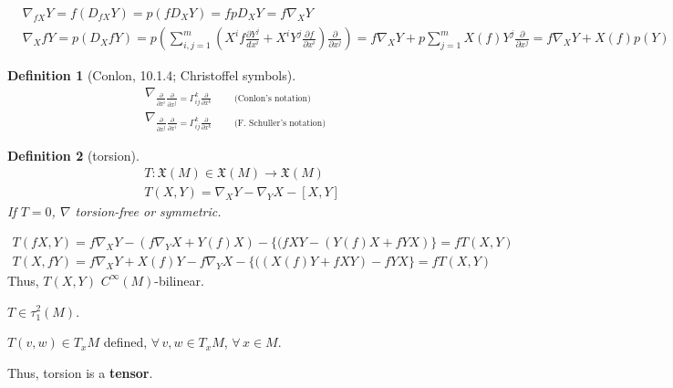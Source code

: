 \documentclass[10pt]{amsart}
\newtheorem{definition}{Definition}
\begin{document}
\begin{multicols*}{2}
\[
\begin{aligned}
	& \nabla_{fX}Y = f(D_{fX}Y) = p(fD_XY) = fpD_XY = f\nabla_XY \\ 
	&  \nabla_X fY = p(D_XfY) = p \left( \sum_{i,j=1}^m \left( X^i f\frac{ \partial Y^j}{ dx^i } + X^i Y^j \frac{ \partial f}{ \partial x^i} \right) \frac{ \partial }{ \partial x^j} \right) = f\nabla_X Y + p \sum_{j=1}^m X(f) Y^j \frac{ \partial }{ \partial x^j} = f\nabla_XY + X(f) p(Y)
\end{aligned}
\]


\begin{definition}[Conlon, 10.1.4; Christoffel symbols] 
\begin{equation}
\begin{gathered}
	\nabla_{\frac{ \partial }{ \partial x^i} \frac{ \partial }{ \partial x^j} = \Gamma^k_{ij} \frac{ \partial }{ \partial x^k} \qquad \, \text{ (Conlon's notation) }  }   \\
	\nabla_{\frac{ \partial }{ \partial x^j} \frac{ \partial }{ \partial x^i} = \Gamma^k_{ij} \frac{ \partial }{ \partial x^k} \qquad \, \text{ (F. Schuller's notation) }  }
\end{gathered}
\end{equation}
\end{definition}





\begin{definition}[torsion]
\begin{equation}
\begin{aligned}
	& T:\mathfrak{X}(M) \in \mathfrak{X}(M) \to \mathfrak{X}(M) \\ 
	& T(X,Y) = \nabla_XY - \nabla_Y X - [X,Y] 
\end{aligned}
\end{equation}
If $T=0$, $\nabla$ torsion-free or symmetric.  
\end{definition}
\[
\begin{gathered}
T(fX,Y) = f\nabla_XY - (f\nabla_Y X + Y(f)X) - \lbrace (fXY - (Y(f)X + fYX) \rbrace = fT(X,Y) \\ 
T(X,fY) = f\nabla_XY + X(f)Y - f\nabla_Y X   - \lbrace ( ( X(f) Y +fXY) -  fYX \rbrace = fT(X,Y)  
\end{gathered}
\]
Thus, $T(X,Y)$ $C^{\infty}(M)$-bilinear.  

$T\in \tau_1^2 (M)$.  

$T(v,w) \in T_xM$ defined, $\forall \, v,w \in T_xM$, $\forall \, x\in M$.

Thus, torsion is a \textbf{tensor}.


\end{multicols*}
\end{document}
